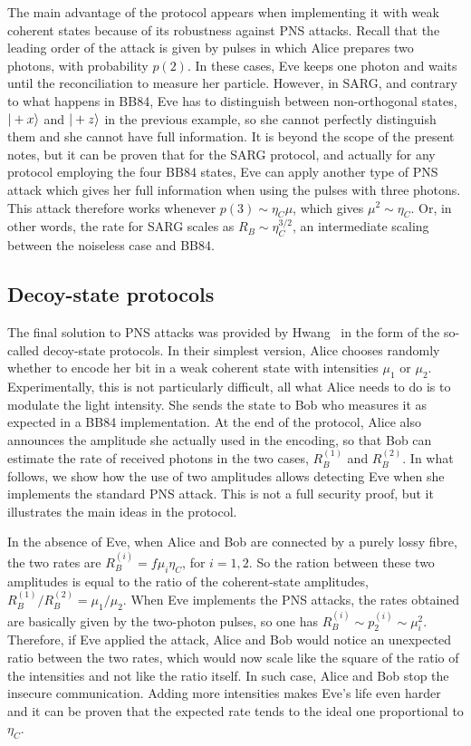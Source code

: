 \documentclass[a4paper]{article}
\begin{document}
The main advantage of the protocol appears when implementing it with weak coherent states because of its robustness against PNS attacks. Recall that the leading order of the attack is given by pulses in which Alice prepares two photons, with probability $p(2)$. In these cases, Eve keeps one photon and waits until the reconciliation to measure her particle. However, in SARG, and contrary to what happens in BB84, Eve has to distinguish between non-orthogonal states, $|+x\rangle$ and $|+z\rangle$ in the previous example, so she cannot perfectly distinguish them and she cannot have full information. It is beyond the scope of the present notes, but it can be proven that for the SARG protocol, and actually for any protocol employing the four BB84 states, Eve can apply another type of PNS attack which gives her full information when using the pulses with three photons. This attack therefore works whenever $p(3)\sim\eta_C\mu$, which gives $\mu^2\sim\eta_C$. Or, in other words, the rate for SARG scales as $R_B\sim \eta_C^{3/2}$, an intermediate scaling between the noiseless case and BB84. 

\subsection{Decoy-state protocols}

The final solution to PNS attacks was provided by Hwang~\cite{decoy} in the form of the so-called decoy-state protocols. In their simplest version, Alice chooses randomly whether to encode her bit in a weak coherent state with intensities $\mu_1$ or $\mu_2$. Experimentally, this is not particularly difficult, all what Alice needs to do is to modulate the light intensity. She sends the state to Bob who measures it as expected in a BB84 implementation. At the end of the protocol, Alice also announces the amplitude she actually used in the encoding, so that Bob can estimate the rate of received photons in the two cases, $R_B^{(1)}$ and $R_B^{(2)}$. In what follows, we show how the use of two amplitudes allows detecting Eve when she implements the standard PNS attack. This is not a full security proof, but it illustrates the main ideas in the protocol.

In the absence of Eve, when Alice and Bob are connected by a purely lossy fibre, the two rates are $R_B^{(i)}=f\mu_i\eta_C$, for $i=1,2$. So the ration between these two amplitudes is equal to the ratio of the coherent-state amplitudes, $R_B^{(1)} /R_B^{(2)}=\mu_1/\mu_2$. When Eve implements the PNS attacks, the rates obtained are basically given by the two-photon pulses, so one has $R_B^{(i)}\sim p_2^{(i)}\sim\mu_i^2$. Therefore, if Eve applied the attack, Alice and Bob would notice an unexpected ratio between the two rates, which would now scale like the square of the ratio of the intensities and not like the ratio itself. In such case, Alice and Bob stop the insecure communication. Adding more intensities makes Eve's life even harder and it can be proven that the expected rate tends to the ideal one proportional to $\eta_C$. 
\end{document}

